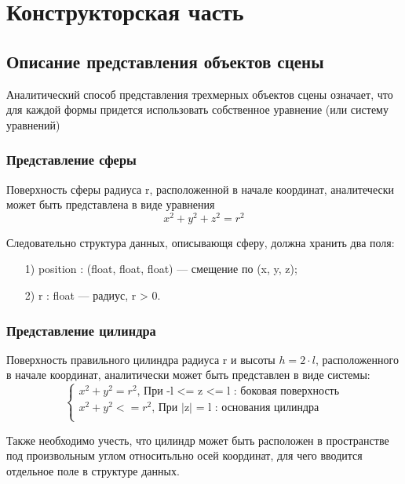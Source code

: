 \chapter{Конструкторская часть}

\section {Описание представления объектов сцены}

Аналитический способ представления трехмерных объектов сцены означает, что
для каждой формы придется использовать собственное уравнение (или систему уравнений)

\subsection*{Представление сферы}

Поверхность сферы радиуса r, расположенной в начале координат, аналитечески может быть представлена в виде уравнения
\begin{equation*}
	x^2 + y^2 + z^2 = r^2
\end{equation*}

Следовательно структура данных, описывающя сферу, должна хранить два поля:
\begin{enumerate}
	\item[1)] position : (float, float, float) --- смещение по (x, y, z);
	\item[2)] r : float --- радиус, r > 0.
\end{enumerate}

\subsection*{Представление цилиндра}

Поверхность правильного цилиндра радиуса r и высоты $h = 2\cdot l$, расположенного в начале координат, аналитически может быть представлен в виде системы:
\begin{equation*}
	\begin{cases}
		x^2 + y^2 = r^2\text{, При -l <= z <= l : боковая поверхность}\\
		x^2 + y^2 <= r^2\text{, При |z| = l : основания цилиндра}\\
	\end{cases}
\end{equation*}

Также необходимо учесть, что цилиндр может быть расположен в пространстве под произвольным углом относитьльно осей координат, для чего вводится отдельное поле в структуре данных.

